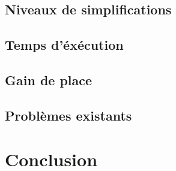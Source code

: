 \documentclass[12pt, twoside]{article}
\let\oldsection\section
\def\section{\cleardoublepage\oldsection}
\begin{document}
\subsection{Niveaux de simplifications}
\subsection{Temps d'éxécution}
\subsection{Gain de place}
\subsection{Problèmes existants}

\newpage
\section*{Conclusion}

\newpage


\end{document}
